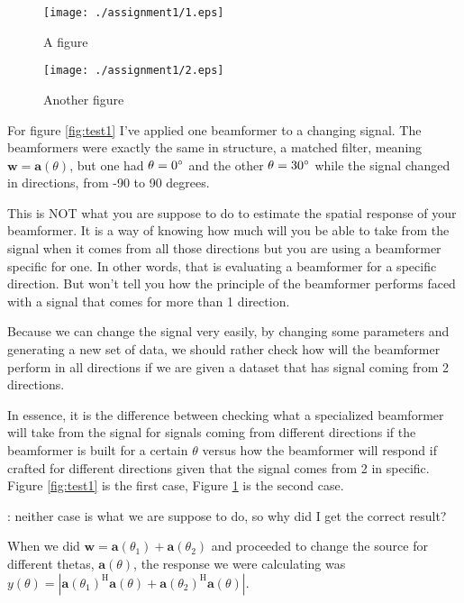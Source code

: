 \documentclass[12pt, a4paper]{article}
\begin{document}
\begin{figure}[h]
    \centering
    \begin{minipage}{.49\textwidth}
      \centering
      \texttt{[image: ./assignment1/1.eps]}
      \caption{A figure}
      \label{fig:test1}
    \end{minipage}
    \begin{minipage}{.49\textwidth}
      \centering
      \texttt{[image: ./assignment1/2.eps]}
      \caption{Another figure}
      \label{fig:test2}
    \end{minipage}
\end{figure}

\par For figure \ref{fig:test1} I've applied one beamformer to a changing signal. The beamformers were exactly the same in structure, a matched filter, meaning $\mathbf{w} = \mathbf{a}(\theta)$, but one had $\theta = 0\degree$ and the other $\theta = 30\degree$ while the signal changed in directions, from -90 to 90 degrees.

\par This is NOT what you are suppose to do to estimate the spatial response of your beamformer. It is a way of knowing how much will you be able to take from the signal when it comes from all those directions but you are using a beamformer specific for one. In other words, that is evaluating a beamformer for a specific direction. But won't tell you how the principle of the beamformer performs faced with a signal that comes for more than 1 direction. 

Because we can change the signal very easily, by changing some parameters and generating a new set of data, we should rather check how will the beamformer perform in all directions if we are given a dataset that has signal coming from 2 directions.

In essence, it is the difference between checking what a specialized beamformer will take from the signal for signals coming from different directions if the beamformer is built for a certain $\theta$ versus how the beamformer will respond if crafted for different directions given that the signal comes from 2 in specific. Figure \ref{fig:test1} is the first case, Figure \ref{fig:test2} is the second case.


\vspace{.8cm}
: neither case is what we are suppose to do, so why did I get the correct result?

When we did $\mathbf{w} = \mathbf{a}(\theta_1) + \mathbf{a}(\theta_2)$ and proceeded to change the source for different thetas, $\mathbf{a}(\theta)$, the response we were calculating was $y(\theta) = |\mathbf{a}(\theta_1)^\text{H} \mathbf{a}(\theta) + \mathbf{a}(\theta_2)^\text{H} \mathbf{a}(\theta)|$.
\end{document}
